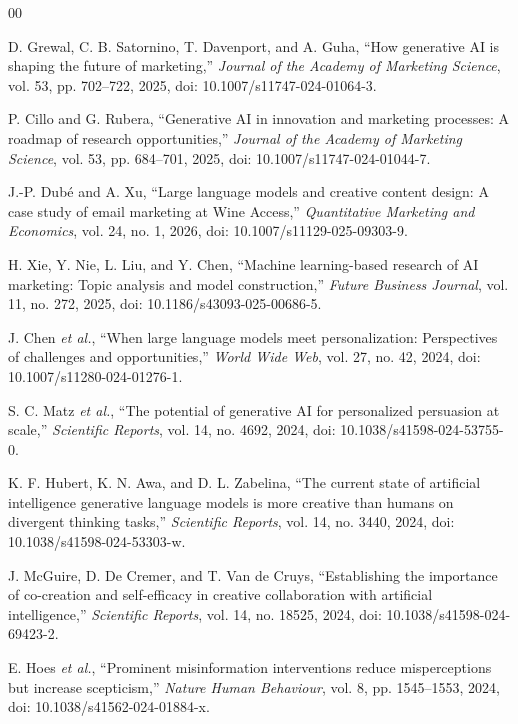 \documentclass[conference]{IEEEtran}
\begin{document}
\begin{thebibliography}{00}

D. Grewal, C. B. Satornino, T. Davenport, and A. Guha, ``How generative AI is shaping the future of marketing,'' \emph{Journal of the Academy of Marketing Science}, vol. 53, pp. 702--722, 2025, doi: 10.1007/s11747-024-01064-3.

P. Cillo and G. Rubera, ``Generative AI in innovation and marketing processes: A roadmap of research opportunities,'' \emph{Journal of the Academy of Marketing Science}, vol. 53, pp. 684--701, 2025, doi: 10.1007/s11747-024-01044-7.

J.-P. Dubé and A. Xu, ``Large language models and creative content design: A case study of email marketing at Wine Access,'' \emph{Quantitative Marketing and Economics}, vol. 24, no. 1, 2026, doi: 10.1007/s11129-025-09303-9.

H. Xie, Y. Nie, L. Liu, and Y. Chen, ``Machine learning-based research of AI marketing: Topic analysis and model construction,'' \emph{Future Business Journal}, vol. 11, no. 272, 2025, doi: 10.1186/s43093-025-00686-5.

J. Chen \emph{et al.}, ``When large language models meet personalization: Perspectives of challenges and opportunities,'' \emph{World Wide Web}, vol. 27, no. 42, 2024, doi: 10.1007/s11280-024-01276-1.

S. C. Matz \emph{et al.}, ``The potential of generative AI for personalized persuasion at scale,'' \emph{Scientific Reports}, vol. 14, no. 4692, 2024, doi: 10.1038/s41598-024-53755-0.

K. F. Hubert, K. N. Awa, and D. L. Zabelina, ``The current state of artificial intelligence generative language models is more creative than humans on divergent thinking tasks,'' \emph{Scientific Reports}, vol. 14, no. 3440, 2024, doi: 10.1038/s41598-024-53303-w.

J. McGuire, D. De Cremer, and T. Van de Cruys, ``Establishing the importance of co-creation and self-efficacy in creative collaboration with artificial intelligence,'' \emph{Scientific Reports}, vol. 14, no. 18525, 2024, doi: 10.1038/s41598-024-69423-2.

E. Hoes \emph{et al.}, ``Prominent misinformation interventions reduce misperceptions but increase scepticism,'' \emph{Nature Human Behaviour}, vol. 8, pp. 1545--1553, 2024, doi: 10.1038/s41562-024-01884-x.


\end{thebibliography}
\end{document}
